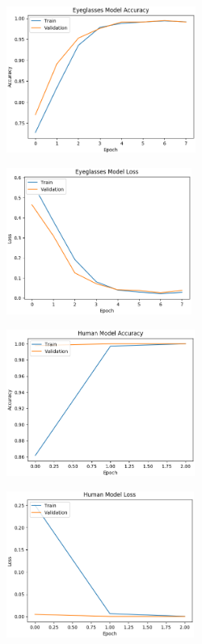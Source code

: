 \documentclass[10pt,twocolumn,letterpaper]{article}
\begin{document}
\begin{figure}[!htbp]
  \begin{subfigure}[t]{.45\linewidth}
    \centering
    \includegraphics[width=\linewidth, height=4.8cm]{Eyeglasses_model_accuracy.png}
  \end{subfigure}
  \hfill
  \begin{subfigure}[t]{.45\linewidth}
    \centering
    \includegraphics[width=\linewidth, height=4.8cm]{Eyeglasses_model_loss.png}
  \end{subfigure}

  \begin{subfigure}[t]{.45\linewidth}
    \centering
    \includegraphics[width=\linewidth, height=4.8cm]{Human_model_accuracy.png}
  \end{subfigure}
  \hfill
  \begin{subfigure}[t]{.45\linewidth}
    \centering
    \includegraphics[width=\linewidth, height=4.8cm]{Human_model_loss.png}
  \end{subfigure}
  

\end{figure}
\end{document}
